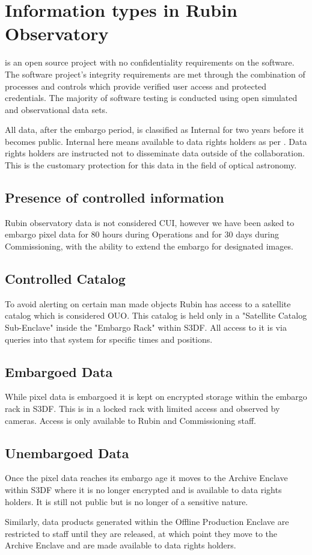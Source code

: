 \section{Information types in Rubin Observatory} \label{sec:infotypes}

\VRO is an open source project with no confidentiality requirements on the software.
The software project’s integrity requirements are met through the combination of
processes and controls which provide verified user access and protected credentials.
The majority of software testing is conducted using open simulated and observational data sets.

All data, after the embargo period,  is classified as Internal for two years before it becomes public.
Internal here means available to data rights holders as per .
Data rights holders are instructed not to disseminate data outside of the collaboration.
This is the customary protection for this data in the field of optical astronomy.

\subsection{Presence of controlled information}\label{sec:cui}
Rubin observatory data is not considered \gls{CUI}, however we have been asked to embargo pixel data for 80 hours during Operations and for 30 days during Commissioning, with the ability to extend the embargo for designated images.

\subsection{Controlled Catalog}\label{sec:controllescat}
To avoid alerting on certain man made objects Rubin has access to a satellite catalog which is considered \gls{OUO}.
This catalog is held only in a "Satellite Catalog Sub-Enclave" inside the "Embargo Rack" within S3DF.
All access to it is via queries into that system for specific times and positions.

\subsection{Embargoed Data} \label{sec:embargo}
While pixel data is embargoed it is kept on encrypted storage within the embargo rack in S3DF.
This is in a locked rack with limited access and observed by cameras.
Access is only available to Rubin and Commissioning staff.

\subsection{Unembargoed Data}
Once the pixel data reaches its embargo age it moves to the Archive Enclave within S3DF where it is no longer encrypted and is available to data rights holders. It is still not public but is no longer of a sensitive nature.

Similarly, data products generated within the Offline Production Enclave are restricted to staff until they are released, at which point they move to the Archive Enclave and are made available to data rights holders.
